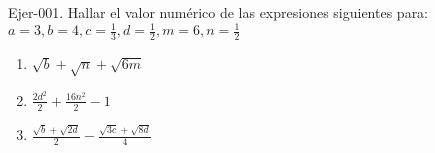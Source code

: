 \begin{frame}

Ejer-001. Hallar el valor numérico de las expresiones siguientes para: $a=3, b=4, c=\frac{1}{3}, d=\frac{1}{2}, m=6, n=\frac{1}{2}$

\begin{enumerate}
\item $\sqrt{b} + \sqrt{n} + \sqrt{6m}$
\item $\frac{2d^2}{2} + \frac{16n^2}{2} -1$
\item $\frac{\sqrt{b}+ \sqrt{2d}}{2} - \frac{\sqrt{3c}+ \sqrt{8d}}{4}$

\end{enumerate}


\end{frame}
